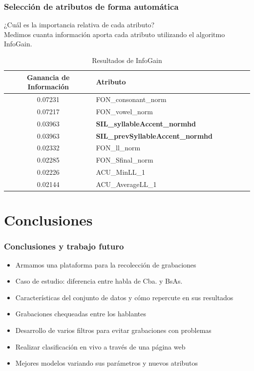\documentclass[mathserif]{beamer}%
\begin{document}
\begin{frame}
	\frametitle{Selección de atributos de forma automática}
		
	¿Cuál es la importancia relativa de cada atributo?	\\
	Medimos cuanta información aporta cada atributo utilizando el algoritmo InfoGain.
	\begin{table}[H]
		\centering
		\begin{tabular}{|c|l|c|c|c|c|c|}
			\hline
			\textbf{Ganancia de Información} & \textbf{Atributo} \\ \hline
			0.07231     & FON\_consonant\_norm \\ \hline
			0.07217     & FON\_vowel\_norm \\ \hline
			0.03963     & \textbf{SIL\_syllableAccent\_normhd }\\ \hline
			0.03963     & \textbf{SIL\_prevSyllableAccent\_normhd} \\ \hline
			0.02332     & FON\_ll\_norm \\ \hline
			0.02285     & FON\_Sfinal\_norm \\ \hline
			0.02226     & ACU\_MinLL\_1 \\ \hline
			0.02144     & ACU\_AverageLL\_1 \\ \hline
		\end{tabular}
		\caption{Resultados de InfoGain}
		\label{infogain-table}
	\end{table}
\end{frame}

\section{Conclusiones}

\begin{frame}
	\frametitle{Conclusiones y trabajo futuro}
	
	\begin{itemize}
		\item Armamos una plataforma para la recolección de grabaciones
		\item Caso de estudio: diferencia entre habla de Cba. y BsAs.
		\item Características del conjunto de datos y cómo repercute en sus resultados 
	\end{itemize}
	
	\begin{itemize}
		\item Grabaciones chequeadas entre los hablantes
		\item Desarrollo de varios filtros para evitar grabaciones con problemas
		\item Realizar clasificación en vivo a través de una página web
		\item Mejores modelos variando sus parámetros y nuevos atributos 
		
	\end{itemize}
\end{frame}
\end{document}
